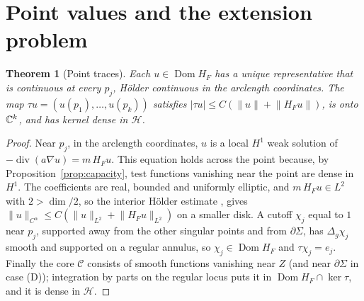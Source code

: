\documentclass[11pt]{article}
\newtheorem{theorem}{Theorem}[section]
\theoremstyle{definition}\newtheorem{definition}[theorem]{Definition}
\theoremstyle{remark}\newtheorem{remark}[theorem]{Remark}
\newcommand{\Dom}{\operatorname{Dom}}\newcommand{\dd}{\,d}
\newcommand{\norm}[1]{\lVert#1\rVert}
\newcommand{\cH}{\mathcal H}\newcommand{\cV}{\mathcal V}\newcommand{\inte}{\operatorname{int}}
\begin{document}
\section{Point values and the extension problem}\label{sec:extension}
\begin{theorem}[Point traces]\label{thm:trace}
Each $u\in\Dom H_F$ has a unique representative that is continuous at every
$p_j$, H\"older continuous in the arclength coordinates. The map
$\tau u=(u(p_1),\dots,u(p_k))$ satisfies
$|\tau u|\leq C(\norm u+\norm{H_Fu})$, is onto $\mathbb C^k$, and has kernel dense
in $\cH$.
\end{theorem}
\begin{proof}
Near $p_j$, in the arclength coordinates, $u$ is a local $H^1$ weak solution
of $-\operatorname{div}(a\nabla u)=m\,H_Fu$. This equation holds across the
point because, by Proposition~\ref{prop:capacity}, test functions vanishing
near the point are dense in $H^1$. The coefficients are real, bounded and
uniformly elliptic, and $m\,H_Fu\in L^2$ with $2>\dim/2$, so the interior
H\"older estimate \cite[Thm.~8.24]{gt}, \cite[Lect.~18]{simon} gives
$\norm u_{C^\alpha}\leq C(\norm u_{L^2}+\norm{H_Fu}_{L^2})$ on a smaller disk.
A cutoff $\chi_j$ equal to $1$ near $p_j$, supported away from the other
singular points and from $\partial\Sigma$, has $\Delta_g\chi_j$ smooth and
supported on a regular annulus, so $\chi_j\in\Dom H_F$ and $\tau\chi_j=e_j$.
Finally the core $\mathcal C$ consists of smooth functions vanishing near $Z$
(and near $\partial\Sigma$ in case (D)); integration by parts on the regular locus
puts it in $\Dom H_F\cap\ker\tau$, and it is dense in $\cH$.
\end{proof}
\end{document}
